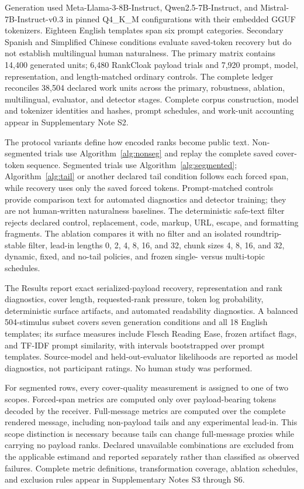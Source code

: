 \documentclass[fleqn,10pt]{wlscirep}
\begin{document}
Generation used Meta-Llama-3-8B-Instruct, Qwen2.5-7B-Instruct, and Mistral-7B-Instruct-v0.3 in pinned Q4\_K\_M configurations with their embedded GGUF tokenizers. Eighteen English templates span six prompt categories. Secondary Spanish and Simplified Chinese conditions evaluate saved-token recovery but do not establish multilingual human naturalness. The primary matrix contains 14,400 generated units; 6,480 RankCloak payload trials and 7,920 prompt, model, representation, and length-matched ordinary controls. The complete ledger reconciles 38,504 declared work units across the primary, robustness, ablation, multilingual, evaluator, and detector stages. Complete corpus construction, model and tokenizer identities and hashes, prompt schedules, and work-unit accounting appear in Supplementary Note S2.

The protocol variants define how encoded ranks become public text. Non-segmented trials use Algorithm~\ref{alg:nonseg} and replay the complete saved cover-token sequence. Segmented trials use Algorithm~\ref{alg:segmented}; Algorithm~\ref{alg:tail} or another declared tail condition follows each forced span, while recovery uses only the saved forced tokens. Prompt-matched controls provide comparison text for automated diagnostics and detector training; they are not human-written naturalness baselines. The deterministic safe-text filter rejects declared control, replacement, code, markup, URL, escape, and formatting fragments. The ablation compares it with no filter and an isolated roundtrip-stable filter, lead-in lengths 0, 2, 4, 8, 16, and 32, chunk sizes 4, 8, 16, and 32, dynamic, fixed, and no-tail policies, and frozen single- versus multi-topic schedules.

The Results report exact serialized-payload recovery, representation and rank diagnostics, cover length, requested-rank pressure, token log probability, deterministic surface artifacts, and automated readability diagnostics. A balanced 504-stimulus subset covers seven generation conditions and all 18 English templates; its surface measures include Flesch Reading Ease\cite{Flesch1948Readability}, frozen artifact flags, and TF-IDF prompt similarity, with intervals bootstrapped over prompt templates. Source-model and held-out-evaluator likelihoods are reported as model diagnostics, not participant ratings. No human study was performed.

For segmented rows, every cover-quality measurement is assigned to one of two scopes. Forced-span metrics are computed only over payload-bearing tokens decoded by the receiver. Full-message metrics are computed over the complete rendered message, including non-payload tails and any experimental lead-in. This scope distinction is necessary because tails can change full-message proxies while carrying no payload ranks. Declared unavailable combinations are excluded from the applicable estimand and reported separately rather than classified as observed failures. Complete metric definitions, transformation coverage, ablation schedules, and exclusion rules appear in Supplementary Notes S3 through S6.
\end{document}
